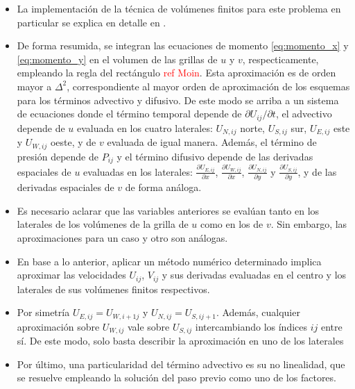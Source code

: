 \documentclass[aps,prb,twocolumn,superscriptaddress,floatfix,longbibliography,10pt]{revtex4-2}
\newif\ifptitle
\newif\ifpnumber
\newcounter{para}
\newcommand\ptitle[1]{\par\refstepcounter{para}
{\ifpnumber{\noindent\textcolor{lightgray}{\textbf{\thepara}}\indent}\fi}
{\ifptitle{\textbf{[{#1}]}}\fi}}
\begin{document}
\ptitle{Volúmenes finitos}
\begin{itemize}
  \item La implementación de la técnica de volúmenes finitos para este problema en particular se explica en detalle en \cite{Notas_materia}. 
  \item De forma resumida, se integran las ecuaciones de momento \ref{eq:momento_x} y \ref{eq:momento_y} en el volumen de las grillas de $u$ y $v$, respecticamente, empleando la regla del rectángulo \textcolor{red}{ref Moin}. Esta aproximación es de orden mayor a $\Delta^2$, correspondiente al mayor orden de aproximación de los esquemas para los términos advectivo y difusivo. De este modo se arriba a un sistema de ecuaciones donde el término temporal depende de $\partial U_{ij}/ \partial t$, el advectivo depende de $u$ evaluada en los cuatro laterales: $U_{N,ij}$ norte, $U_{S,ij}$ sur, $U_{E,ij}$ este y $U_{W,ij}$ oeste, y de $v$ evaluada de igual manera. Además, el término de presión depende de $P_{ij}$ y el término difusivo depende de las derivadas espaciales de $u$ evaluadas en los laterales: $\frac{\partial U_{E,ij}}{\partial x}$, $\frac{\partial U_{W,ij}}{\partial x}$, $\frac{\partial U_{N,ij}}{\partial y}$ y $\frac{\partial U_{S,ij}}{\partial y}$, y de las derivadas espaciales de $v$ de forma análoga.
  \item Es necesario aclarar que las variables anteriores se evalúan tanto en los laterales de los volúmenes de la grilla de $u$ como en los de $v$. Sin embargo, las aproximaciones para un caso y otro son análogas.
  \item En base a lo anterior, aplicar un método numérico determinado implica aproximar las velocidades $U_{ij}$, $V_{ij}$ y sus derivadas evaluadas en el centro y los laterales de sus volúmenes finitos respectivos.
  \item Por simetría $U_{E,ij} = U_{W,i+1j}$ y $U_{N,ij} = U_{S,ij+1}$. Además, cualquier aproximación sobre $U_{W,ij}$ vale sobre $U_{S,ij}$ intercambiando los índices $ij$ entre sí. De este modo, solo basta describir la aproximación en uno de los laterales
  \item Por último, una particularidad del término advectivo es su no linealidad, que se resuelve empleando la solución del paso previo como uno de los factores.
\end{itemize}
\end{document}
